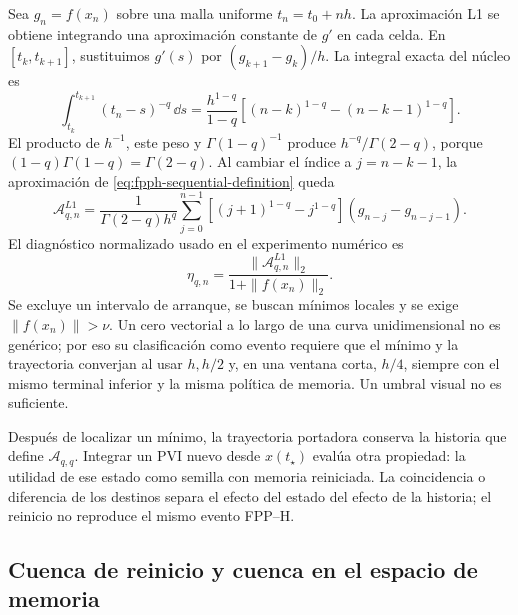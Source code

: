 Sea \(g_n=f(x_n)\) sobre una malla uniforme \(t_n=t_0+nh\). La aproximación L1
se obtiene integrando una aproximación constante de \(g'\) en cada celda.
En \([t_k,t_{k+1}]\), sustituimos
\(g'(s)\) por \((g_{k+1}-g_k)/h\). La integral exacta del núcleo es
\begin{equation}
 \int_{t_k}^{t_{k+1}}(t_n-s)^{-q}\,\dd s
 =\frac{h^{1-q}}{1-q}
 \left[(n-k)^{1-q}-(n-k-1)^{1-q}\right].
 \label{eq:fpph-l1-cell-integral}
\end{equation}
El producto de \(h^{-1}\), este peso y \(\Gamma(1-q)^{-1}\) produce
\(h^{-q}/\Gamma(2-q)\), porque
\((1-q)\Gamma(1-q)=\Gamma(2-q)\). Al cambiar el índice a
\(j=n-k-1\), la aproximación de \cref{eq:fpph-sequential-definition}
queda
\begin{equation}
 \mathcal A_{q,n}^{L1}
 =\frac1{\Gamma(2-q)h^q}
 \sum_{j=0}^{n-1}
 \left[(j+1)^{1-q}-j^{1-q}\right]
 (g_{n-j}-g_{n-j-1}).
 \label{eq:fpph-l1}
\end{equation}
El diagnóstico normalizado usado en el experimento numérico es
\begin{equation}
 \eta_{q,n}
 =\frac{\|\mathcal A_{q,n}^{L1}\|_2}{1+\|f(x_n)\|_2}.
 \label{eq:fpph-normalized}
\end{equation}
Se excluye un intervalo de arranque, se buscan mínimos locales y se exige
\(\|f(x_n)\|>\nu\). Un cero vectorial a lo largo de una curva unidimensional
no es genérico; por eso su clasificación como evento requiere que el mínimo y
la trayectoria converjan al usar \(h,h/2\) y, en una ventana corta, \(h/4\), siempre con el
mismo terminal inferior y la misma política de memoria. Un umbral visual no
es suficiente.

Después de localizar un mínimo, la trayectoria portadora conserva la
historia que define \(\mathcal A_{q,q}\). Integrar un PVI nuevo desde
\(x(t_\star)\) evalúa otra propiedad: la utilidad de ese estado como semilla
con memoria reiniciada. La coincidencia o diferencia de los destinos separa
el efecto del estado del efecto de la historia; el reinicio no reproduce
el mismo evento FPP--H.

\subsection{Cuenca de reinicio y cuenca en el espacio de memoria}


